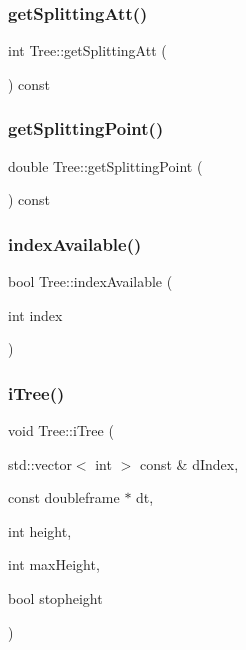 \mbox{\label{classTree_a877c320f9bed56b1f6d64fc04bd86b97}} 
\subsubsection{\texorpdfstring{get\+Splitting\+Att()}{getSplittingAtt()}}
{\footnotesize\ttfamily int Tree\+::get\+Splitting\+Att (\begin{DoxyParamCaption}{ }\end{DoxyParamCaption}) const}

\mbox{\label{classTree_af06e12f440902448730cbe0a7d4fd9a6}} 
\subsubsection{\texorpdfstring{get\+Splitting\+Point()}{getSplittingPoint()}}
{\footnotesize\ttfamily double Tree\+::get\+Splitting\+Point (\begin{DoxyParamCaption}{ }\end{DoxyParamCaption}) const}

\mbox{\label{classTree_a55ec593d15665c30a9c060db4de09934}} 
\subsubsection{\texorpdfstring{index\+Available()}{indexAvailable()}}
{\footnotesize\ttfamily bool Tree\+::index\+Available (\begin{DoxyParamCaption}\item[{int}]{index }\end{DoxyParamCaption})}

\mbox{\label{classTree_adf8961073e1d8d7c40c6cb6e6f41bc4c}} 
\subsubsection{\texorpdfstring{i\+Tree()}{iTree()}}
{\footnotesize\ttfamily void Tree\+::i\+Tree (\begin{DoxyParamCaption}\item[{std\+::vector$<$ int $>$ const \&}]{d\+Index,  }\item[{const doubleframe $\ast$}]{dt,  }\item[{int}]{height,  }\item[{int}]{max\+Height,  }\item[{bool}]{stopheight }\end{DoxyParamCaption})}

